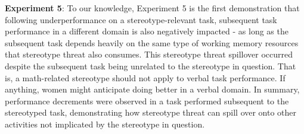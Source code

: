 \documentclass[
  doc, a4paper]{apa7}
\begin{document}
\textbf{Experiment 5}:
To our knowledge, Experiment 5 is the first demonstration that following underperformance on a stereotype-relevant task, subsequent task performance in a different domain is also negatively impacted - as long as the subsequent task depends heavily on the same type of working memory resources that stereotype threat also consumes. This stereotype threat spillover occurred despite the subsequent task being unrelated to the stereotype in question. That is, a math-related stereotype should not apply to verbal task performance. If anything, women might anticipate doing better in a verbal domain. In summary, performance decrements were observed in a task performed subsequent to the stereotyped task, demonstrating how stereotype threat can spill over onto other activities not implicated by the stereotype in question.
\end{document}

